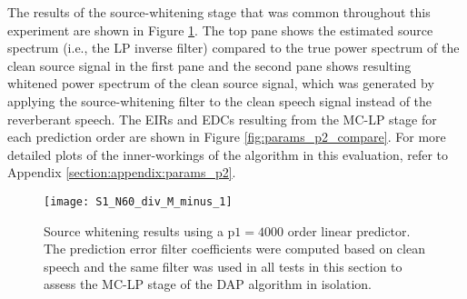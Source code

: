 The results of the source-whitening stage that was common throughout this experiment are shown in Figure \ref{fig:params_p2_stage1}. The top pane shows the estimated source spectrum (i.e., the LP inverse filter) compared to the true power spectrum of the clean source signal in the first pane and the second pane shows resulting whitened power spectrum of the clean source signal, which was generated by applying the source-whitening filter to the clean speech signal instead of the reverberant speech. The EIRs and EDCs resulting from the MC-LP stage for each prediction order are shown in Figure \ref{fig:params_p2_compare}. For more detailed plots of the inner-workings of the algorithm in this evaluation, refer to Appendix \ref{section:appendix:params_p2}. 

%


\begin{figure}[H]
	\texttt{[image: S1\_N60\_div\_M\_minus\_1]}
	\centering
	\caption[Source whitening results used in analysis of DAP dereverberation performance for various MC-LP orders]{Source whitening results using a $\mathrm{p1} = 4000$ order linear predictor. The prediction error filter coefficients were computed based on clean speech and the same filter was used in all tests in this section to assess the MC-LP stage of the DAP algorithm in isolation.}
	\label{fig:params_p2_stage1}
\end{figure}


